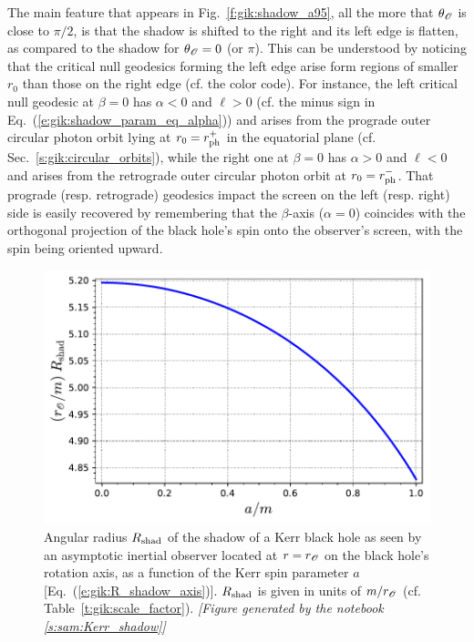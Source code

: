 The main feature that appears in Fig.~\ref{f:gik:shadow_a95}, all the more
that $\theta_{\mathscr{O}}$ is close to $\pi/2$, is that
the shadow is shifted to the right and its left edge is flatten, as compared
to the shadow for $\theta_{\mathscr{O}}= 0$ (or $\pi$).
This can be understood by noticing that the
critical null geodesics forming the left edge arise form regions of smaller $r_0$
than those on the right edge (cf. the color code). For instance, the left critical null geodesic
at $\beta=0$ has $\alpha<0$ and $\ell > 0$ (cf. the minus sign in
Eq.~(\ref{e:gik:shadow_param_eq_alpha}))
and arises from the prograde outer circular photon orbit lying at $r_0 = r_{\rm ph}^+$
in the equatorial plane (cf. Sec.~\ref{s:gik:circular_orbits}), while the right one at $\beta=0$
has $\alpha>0$ and $\ell < 0$ and arises from the retrograde outer circular photon orbit
at $r_0 = r_{\rm ph}^-$. That prograde (resp. retrograde) geodesics impact the screen
on the left (resp. right) side is easily recovered by remembering that the $\beta$-axis
($\alpha=0$) coincides with the orthogonal projection of the black hole's spin onto the
observer's screen, with the spin being oriented upward.

\begin{figure}
\centerline{
\includegraphics[height=0.28\textheight]{gik_shadow_radius_axis.pdf} }
\caption[]{\label{f:gik:shadow_radius_axis} \footnotesize
Angular radius $R_{\rm shad}$ of the shadow of a Kerr black
hole as seen by an asymptotic inertial observer located at $r=r_{\mathscr{O}}$ on the
black hole's rotation axis, as a function of the Kerr spin parameter $a$
[Eq.~(\ref{e:gik:R_shadow_axis})]. $R_{\rm shad}$ is given in units
of $m/r_{\mathscr{O}}$ (cf. Table~\ref{t:gik:scale_factor}).
\textsl{[Figure generated by the notebook \ref{s:sam:Kerr_shadow}]}
}
\end{figure}



